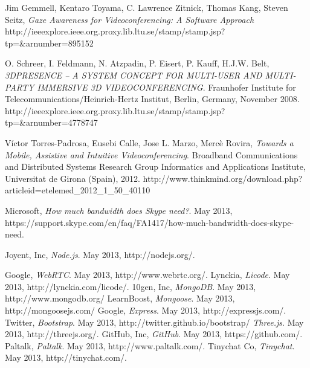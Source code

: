 \documentclass[12pt, titlepage]{article}
\begin{document}
\begin{thebibliography}{9}
Jim Gemmell, Kentaro Toyama, C. Lawrence Zitnick, Thomas Kang, Steven Seitz,
\emph{Gaze Awareness for Videoconferencing: A Software Approach}
http://ieeexplore.ieee.org.proxy.lib.ltu.se/stamp/stamp.jsp?tp=\&arnumber=895152

O. Schreer, I. Feldmann, N. Atzpadin, P. Eisert, P. Kauff, H.J.W. Belt, 
\emph{3DPRESENCE – A SYSTEM CONCEPT FOR MULTI-USER AND MULTI-PARTY IMMERSIVE 3D VIDEOCONFERENCING}.
Fraunhofer Institute for Telecommunications/Heinrich-Hertz Institut, Berlin, Germany, November 2008.
http://ieeexplore.ieee.org.proxy.lib.ltu.se/stamp/stamp.jsp?tp=\&arnumber=4778747

Víctor Torres-Padrosa, Eusebi Calle, Jose L. Marzo, Mercè Rovira,
\emph{Towards a Mobile, Assistive and Intuitive Videoconferencing}.
Broadband Communications and Distributed Systems Research Group Informatics and Applications Institute, Universitat de Girona (Spain), 2012.
http://www.thinkmind.org/download.php?articleid=etelemed\_2012\_1\_50\_40110

Microsoft,
\emph{ How much bandwidth does Skype need?}.
May 2013,
https://support.skype.com/en/faq/FA1417/how-much-bandwidth-does-skype-need.

  Joyent, Inc,
  \emph{Node.js}.
  May 2013,
  http://nodejs.org/.
  
  Google,
  \emph{WebRTC}.
  May 2013,
  http://www.webrtc.org/.  
  Lynckia,
  \emph{Licode}.
  May 2013,
  http://lynckia.com/licode/.
  10gen, Inc,
  \emph{MongoDB}.
  May 2013,
  http://www.mongodb.org/
  LearnBoost,
  \emph{Mongoose}.
  May 2013,
  http://mongoosejs.com/
  Google,
  \emph{Express}.
  May 2013,
  http://expressjs.com/.
  Twitter,
  \emph{Bootstrap}.
  May 2013,
  http://twitter.github.io/bootstrap/
  \emph{Three.js}.
  May 2013,
  http://threejs.org/.
  GitHub, Inc,
  \emph{GitHub}.
  May 2013,
  https://github.com/.
  Paltalk,
  \emph{Paltalk}.
  May 2013,
  http://www.paltalk.com/.
  Tinychat Co,
  \emph{Tinychat}.
  May 2013,
  http://tinychat.com/.    
\end{thebibliography}
\end{document}
